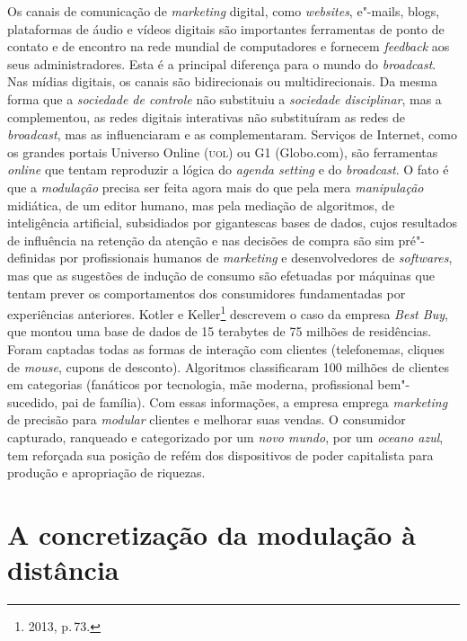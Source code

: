 Os canais de comunicação de \emph{marketing} digital, como
\emph{websites}, e"-mails, blogs, plataformas de áudio e vídeos digitais
são importantes ferramentas de ponto de contato e de encontro na rede
mundial de computadores e fornecem \emph{feedback} aos seus
administradores. Esta é a principal diferença para o mundo do
\emph{broadcast}. Nas mídias digitais, os canais são bidirecionais ou
multidirecionais. Da mesma forma que a \emph{sociedade de controle} não
substituiu a \emph{sociedade disciplinar}, mas a complementou, as redes
digitais interativas não substituíram as redes de \emph{broadcast}, mas
as influenciaram e as complementaram. Serviços de Internet, como os
grandes portais Universo Online (\textsc{uol}) ou G1 (Globo.com), são ferramentas
\emph{online} que tentam reproduzir a lógica do \emph{agenda setting} e
do \emph{broadcast}. O fato é que a \emph{modulação} precisa ser feita
agora mais do que pela mera \emph{manipulação} midiática, de um editor
humano, mas pela mediação de algoritmos, de inteligência artificial,
subsidiados por gigantescas bases de dados, cujos resultados de
influência na retenção da atenção e nas decisões de compra são sim
pré"-definidas por profissionais humanos de \emph{marketing} e
desenvolvedores de \emph{softwares}, mas que as sugestões de indução de
consumo são efetuadas por máquinas que tentam prever os comportamentos
dos consumidores fundamentadas por experiências anteriores. Kotler e
Keller\footnote{2013, p.\,73.} descrevem o caso da empresa \emph{Best Buy}, que
montou uma base de dados de 15 terabytes de 75 milhões de residências.
Foram captadas todas as formas de interação com clientes (telefonemas,
cliques de \emph{mouse}, cupons de desconto). Algoritmos classificaram
100 milhões de clientes em categorias (fanáticos por tecnologia, mãe
moderna, profissional bem"-sucedido, pai de família). Com essas
informações, a empresa emprega \emph{marketing} de precisão para
\emph{modular} clientes e melhorar suas vendas. O consumidor capturado,
ranqueado e categorizado por um \emph{novo mundo}, por um \emph{oceano
azul}, tem reforçada sua posição de refém dos dispositivos de poder
capitalista para produção e apropriação de riquezas.

\section{A concretização da modulação à distância}

